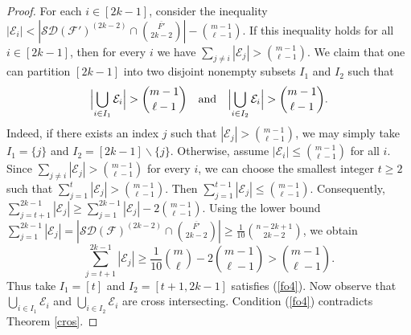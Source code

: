 \documentclass[11pt]{article}
\numberwithin{equation}{section}
\begin{document}
	\begin{proof}
For each $i\in [2k-1]$, consider the inequality
$|\mathcal{E}_i| < |\mathcal{SD}(\mathcal{F'})^{(2k-2)} \cap \binom{\overline{F'}}{2k-2}| - \binom{m-1}{\ell-1}$.
If this inequality holds for all  $i\in [2k-1]$,
	 then  for every $i$ we have $\sum_{j\neq i}|\mathcal{E}_j|> \binom{m-1}{\ell-1}$.
     We claim that  one can partition $[2k-1]$ into two disjoint nonempty subsets $I_1$ and $ I_2$ such that
		 \begin{align}
		\Bigl| \bigcup_{i \in I_1} \mathcal{E}_i \Bigr| > \binom{m-1}{\ell-1}
		\quad\text{and}\quad
		\Bigl| \bigcup_{i \in I_2} \mathcal{E}_i \Bigr| > \binom{m-1}{\ell-1}.\label{fo4}
\end{align}
Indeed, if there exists an index $j$ such that $|\mathcal{E}_j|>\binom{m-1}{\ell-1}$, we may simply take $I_1=\{j\}$ and $I_2=[2k-1]\backslash \{j\}$.
Otherwise, assume $|\mathcal{E}_i|\leq\binom{m-1}{\ell-1}$ for all $i$.
Since $ \sum_{j\neq i}|\mathcal{E}_j|> \binom{m-1}{\ell-1}$ for every $i$, we can choose the smallest integer $t\geq 2$  such that  $ \sum_{j=1}^{t} |\mathcal{E}_j|> \binom{m-1}{\ell-1}$.
Then $ \sum_{j=1}^{t-1} |\mathcal{E}_j|\leq \binom{m-1}{\ell-1}$.
Consequently,   $\sum_{j=t+1}^{2k-1} |\mathcal{E}_j|\geq  \sum_{j=1}^{2k-1} |\mathcal{E}_j|-2\binom{m-1}{\ell-1}$.
Using the lower bound $\sum_{j=1}^{2k-1} |\mathcal{E}_j|=\left|\mathcal{SD}(\mathcal{F})^{(2k-2)}\cap\binom{\overline{F'}}{2k-2}\right|\ge\frac{1}{10}\binom{n-2k+1}{2k-2}$, we obtain
$$\sum_{j=t+1}^{2k-1} |\mathcal{E}_j|\ge\frac{1}{10}\binom{m}{\ell}-2\binom{m-1}{\ell-1}>\binom{m-1}{\ell-1}.$$
Thus take  $I_1=[t]$ and $I_2=[t+1, 2k-1]$ satisfies (\ref{fo4}).
Now observe that  $\bigcup_{i \in I_1} \mathcal{E}_i$ and   $\bigcup_{i \in I_2} \mathcal{E}_i$ are cross intersecting. Condition (\ref{fo4}) contradicts   Theorem \ref{cros}.
		

\end{proof}
\end{document}
